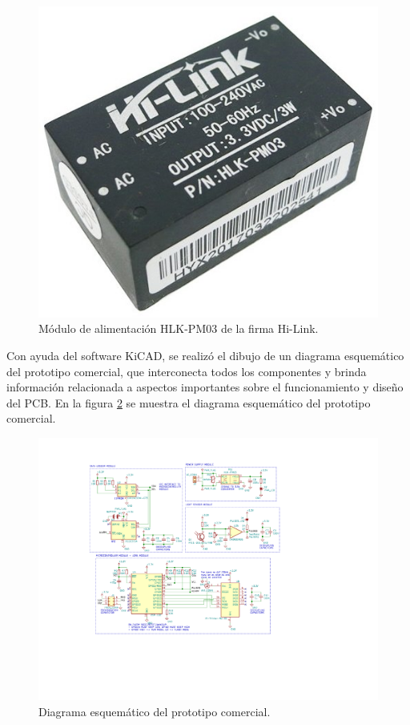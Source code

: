 \begin{figure}[h]
	\centering
	\includegraphics[scale=0.3]{./Figures/acdc_module.jpg}
	\caption{Módulo de alimentación HLK-PM03 de la firma Hi-Link\protect\footnotemark.}
		\label{fig:powerModule}
\end{figure}

	
Con ayuda del software KiCAD, se realizó el dibujo de un diagrama esquemático del prototipo comercial, que interconecta todos los componentes y brinda información relacionada a aspectos importantes sobre el funcionamiento y diseño del PCB. En la figura \ref{fig:schematic} se muestra el diagrama esquemático del prototipo comercial.

\begin{figure}[h]
	\centering
	\includegraphics[scale=0.9]{./Figures/schematic.pdf}
	\caption{Diagrama esquemático del prototipo comercial.}
		\label{fig:schematic}
\end{figure}

